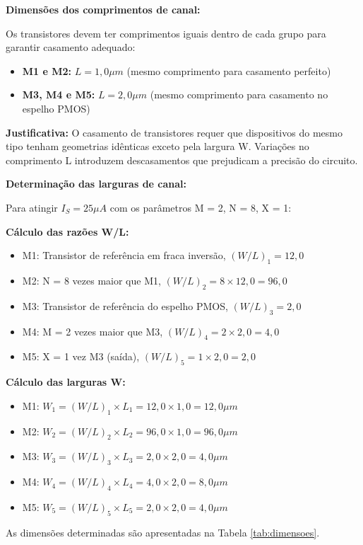 ﻿\documentclass[12pt,a4paper]{article}
\begin{document}
\textbf{Dimensões dos comprimentos de canal:}

Os transistores devem ter comprimentos iguais dentro de cada grupo para garantir casamento adequado:
\begin{itemize}
    \item \textbf{M1 e M2:} $L = 1,0 \mu m$ (mesmo comprimento para casamento perfeito)
    \item \textbf{M3, M4 e M5:} $L = 2,0 \mu m$ (mesmo comprimento para casamento no espelho PMOS)
\end{itemize}

\textbf{Justificativa:} O casamento de transistores requer que dispositivos do mesmo tipo tenham geometrias idênticas exceto pela largura W. Variações no comprimento L introduzem descasamentos que prejudicam a precisão do circuito.

\textbf{Determinação das larguras de canal:}

Para atingir $I_S = 25 \mu A$ com os parâmetros M = 2, N = 8, X = 1:

\textbf{Cálculo das razões W/L:}
\begin{itemize}
    \item M1: Transistor de referência em fraca inversão, $(W/L)_1 = 12,0$
    \item M2: N = 8 vezes maior que M1, $(W/L)_2 = 8 \times 12,0 = 96,0$
    \item M3: Transistor de referência do espelho PMOS, $(W/L)_3 = 2,0$
    \item M4: M = 2 vezes maior que M3, $(W/L)_4 = 2 \times 2,0 = 4,0$
    \item M5: X = 1 vez M3 (saída), $(W/L)_5 = 1 \times 2,0 = 2,0$
\end{itemize}

\textbf{Cálculo das larguras W:}
\begin{itemize}
    \item M1: $W_1 = (W/L)_1 \times L_1 = 12,0 \times 1,0 = 12,0 \mu m$
    \item M2: $W_2 = (W/L)_2 \times L_2 = 96,0 \times 1,0 = 96,0 \mu m$
    \item M3: $W_3 = (W/L)_3 \times L_3 = 2,0 \times 2,0 = 4,0 \mu m$
    \item M4: $W_4 = (W/L)_4 \times L_4 = 4,0 \times 2,0 = 8,0 \mu m$
    \item M5: $W_5 = (W/L)_5 \times L_5 = 2,0 \times 2,0 = 4,0 \mu m$
\end{itemize}

As dimensões determinadas são apresentadas na Tabela \ref{tab:dimensoes}.
\end{document}
